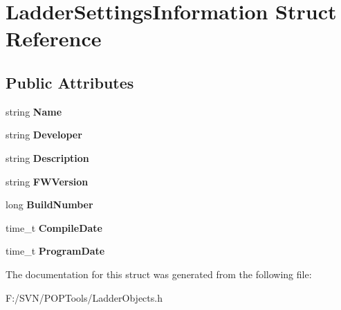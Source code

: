 \hypertarget{struct_ladder_settings_information}{\section{Ladder\-Settings\-Information Struct Reference}
\label{struct_ladder_settings_information}
}
\subsection*{Public Attributes}
\begin{DoxyCompactItemize}
\item 
\hypertarget{struct_ladder_settings_information_a04951d72474cc70faa44968dab345d81}{string {\bfseries Name}}\label{struct_ladder_settings_information_a04951d72474cc70faa44968dab345d81}

\item 
\hypertarget{struct_ladder_settings_information_afe89939c4effb7bb388a1920d37b15b2}{string {\bfseries Developer}}\label{struct_ladder_settings_information_afe89939c4effb7bb388a1920d37b15b2}

\item 
\hypertarget{struct_ladder_settings_information_a39d70c117bb160fc1a897034313954c8}{string {\bfseries Description}}\label{struct_ladder_settings_information_a39d70c117bb160fc1a897034313954c8}

\item 
\hypertarget{struct_ladder_settings_information_a2726d621049c8bc292c9848659620d39}{string {\bfseries F\-W\-Version}}\label{struct_ladder_settings_information_a2726d621049c8bc292c9848659620d39}

\item 
\hypertarget{struct_ladder_settings_information_a567f5cc4c671c46ffc280941c92f16c0}{long {\bfseries Build\-Number}}\label{struct_ladder_settings_information_a567f5cc4c671c46ffc280941c92f16c0}

\item 
\hypertarget{struct_ladder_settings_information_aff5c8e604653fd189f5b35af0598f293}{time\-\_\-t {\bfseries Compile\-Date}}\label{struct_ladder_settings_information_aff5c8e604653fd189f5b35af0598f293}

\item 
\hypertarget{struct_ladder_settings_information_add7fbff3ae16bc2be9541c65e4c54771}{time\-\_\-t {\bfseries Program\-Date}}\label{struct_ladder_settings_information_add7fbff3ae16bc2be9541c65e4c54771}

\end{DoxyCompactItemize}


The documentation for this struct was generated from the following file\-:\begin{DoxyCompactItemize}
\item 
F\-:/\-S\-V\-N/\-P\-O\-P\-Tools/Ladder\-Objects.\-h\end{DoxyCompactItemize}
